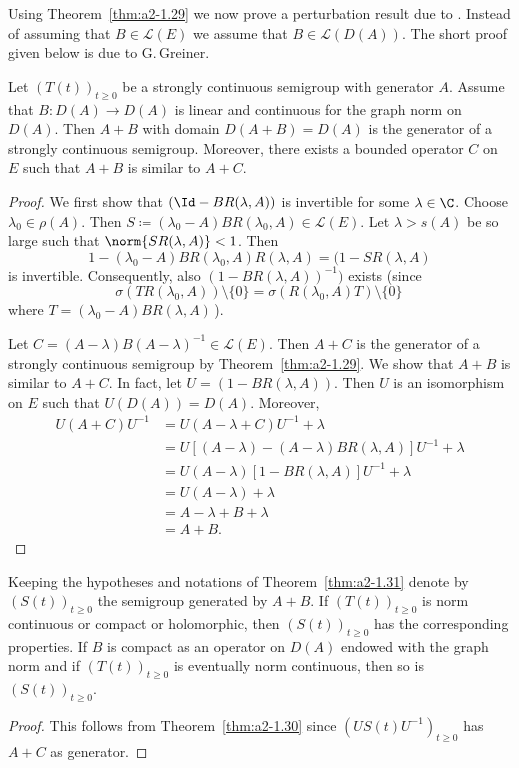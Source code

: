 Using Theorem~\ref{thm:a2-1.29}   we now prove a perturbation result due to \textcite{deschschappacher:1984}.
Instead of assuming that $B \in \mathcal{L}(E)$ we assume that $B \in \mathcal{L}(D(A))$.
The short proof given below is due to G.\,Greiner.
\begin{theorem}\label{thm:a2-1.31}
Let $(T(t))_{t \geq 0}$ be a strongly continuous semigroup with generator $A$.
Assume that $B \colon D(A) \to D(A)$ is linear and continuous for the graph norm on $D(A)$.
Then $A + B$ with domain $D(A + B) = D(A)$ is the generator of a strongly continuous semigroup.
Moreover, there exists a bounded operator $C$ on $E$ such that $A + B$ is similar to $A + C$.
\end{theorem}
\begin{proof}
We first show that $(\Id - BR(\lambda,A))$ is invertible for some $\lambda \in \C$.
Choose $\lambda_{0} \in \rho(A)$.
Then $S \coloneqq (\lambda_{0}-A)BR(\lambda_{0},A) \in \mathcal{L}(E)$.
Let $\lambda > s(A)$ be so large such that $\norm{SR(\lambda,A)} < 1$.
Then 
\[
1 - (\lambda_{0} - A)BR(\lambda_{0},A)R(\lambda,A) = (1 - SR(\lambda,A)
\]
is invertible.
Consequently, also $(1 -BR(\lambda,A))^{-1})$ exists
(since 
\[
\sigma(TR(\lambda_{0},A)) \setminus \{0\} 
= \sigma(R(\lambda_{0},A)T) \setminus \{0\}\,
\]
where  $T = (\lambda_{0}-A)BR(\lambda,A)\, $).

Let $C = (A-\lambda)B(A-\lambda)^{-1} \in \mathcal{L}(E)$.
Then $A + C$ is the generator of a strongly continuous semigroup by Theorem~\ref{thm:a2-1.29}. 
We show that $A + B$ is similar to $A + C$.
In fact, let $U = (1 - BR(\lambda,A))$.
Then $U$ is an isomorphism on $E$ such that $U(D(A)) = D(A)$. Moreover,
\begin{align*}		
U(A+C)U^{-1} &= U(A - \lambda+C)U^{-1} + \lambda \\
&= U[(A - \lambda) - (A-\lambda)BR(\lambda,A)]U^{-1} + \lambda \\
&= U(A - \lambda)[1 - BR(\lambda,A)]U^{-1} + \lambda \\
&= U(A - \lambda) + \lambda \\
&= A - \lambda + B + \lambda \\
&= A + B.	
\end{align*}
\end{proof}
\begin{corollary}\label{cor:a2-1.32}
Keeping the hypotheses and notations of Theorem~\ref{thm:a2-1.31}   denote by \\ $(S(t))_{t\geq 0}$ the semigroup generated by $A+B$.
If\/ $(T(t))_{t\geq 0}$ is norm continuous or compact or holomorphic, then $(S(t))_{t\geq 0}$ has the corresponding properties.
If\/ $B$ is compact as an operator on $D(A)$ endowed with the graph norm and if\/ $(T(t))_{t\geq 0}$ is eventually norm continuous, then so is $(S(t))_{t\geq 0}$.
\end{corollary}
\begin{proof}
This follows from Theorem~\ref{thm:a2-1.30}   since 
$(US(t)U^{-1})_{t\geq 0}$ has $A+C$ as generator.
\end{proof}
